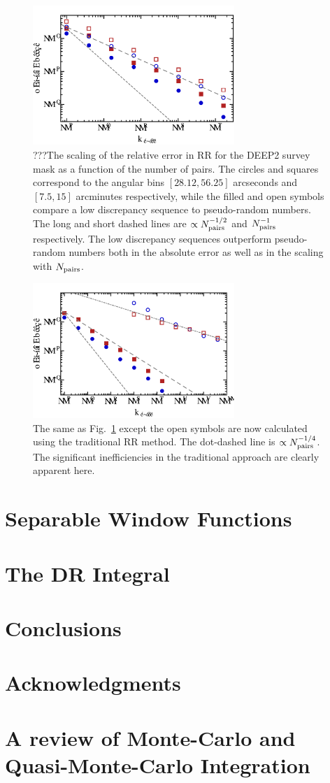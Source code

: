 \documentclass[usenatbib]{mn2e}
\begin{document}
\begin{figure}
\includegraphics[width=3in]{plots/deep2rrcomp1}
\caption{???The scaling of the relative error in RR for the DEEP2 survey mask as
a function of the number of pairs. The circles and squares correspond to the
angular bins $[28.12,56.25]$ arcseconds and $[7.5,15]$ arcminutes respectively,
while the filled and open symbols compare a low discrepancy
sequence to pseudo-random numbers. The long and short dashed lines are
$\propto N_{\rm pairs}^{-1/2}$ and $N_{\rm pairs}^{-1}$ respectively. The low
discrepancy sequences outperform pseudo-random numbers both in the
absolute error as well as in the scaling with $N_{\rm pairs}$.}
\label{fig:deep2comp1}
\end{figure}

\begin{figure}
\includegraphics[width=3in]{plots/deep2rrcomp2}
\caption{The same as Fig.~\ref{fig:deep2comp1} except the open symbols are now
calculated using the traditional RR method. The dot-dashed line is $\propto
N_{\rm pairs}^{-1/4}$. The significant inefficiencies in the traditional
approach are clearly apparent here. }
\label{fig:deep2comp2}
\end{figure}



\section{Separable Window Functions}
\label{sec:sep}

\section{The DR Integral}
\label{sec:DR}

\section{Conclusions}
\label{sec:conclude}


\section{Acknowledgments}

\appendix

\section{A review of Monte-Carlo and Quasi-Monte-Carlo Integration}
\label{sec:review}
\end{document}
